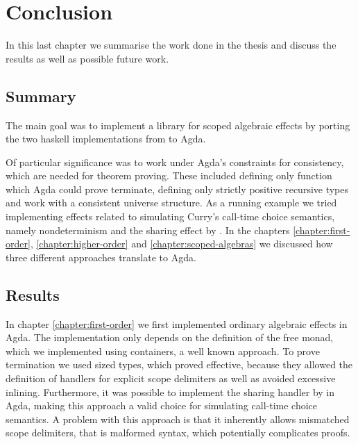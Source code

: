 \documentclass[10pt,a4paper,twoside,notitlepage]{report}
\begin{document}
\chapter{Conclusion}
\label{chapter:conclusion}

In this last chapter we summarise the work done in the thesis and discuss the
results as well as possible future work.

\section{Summary}

The main goal was to implement a library for scoped algebraic effects by
porting the two haskell implementations from
 to Agda.

Of particular significance was to work under Agda's constraints for consistency,
which are needed for theorem proving.
These included defining only function which Agda could prove terminate, defining
only strictly positive recursive types and work with a consistent universe
structure.
As a running example we tried implementing effects related to simulating Curry's
call-time choice semantics, namely nondeterminism and the sharing effect by
\textcite{bunkenburg2019modeling}.
In the chapters \ref{chapter:first-order}, \ref{chapter:higher-order} and
\ref{chapter:scoped-algebras} we discussed how three different approaches
translate to Agda.


\section{Results}

In chapter \ref{chapter:first-order} we first implemented ordinary algebraic
effects in Agda.
The implementation only depends on the definition of the free monad, which
we implemented using containers, a well known approach.
To prove termination we used sized types, which proved effective, because they
allowed the definition of \textcite{DBLP:conf/haskell/WuSH14} handlers for
explicit scope delimiters as well as avoided excessive inlining.
Furthermore, it was possible to implement the sharing handler by
\textcite{bunkenburg2019modeling} in Agda, making this approach a valid choice
for simulating call-time choice semantics.
A problem with this approach is that it inherently allows mismatched scope
delimiters, that is malformed syntax, which potentially complicates proofs.
\end{document}
